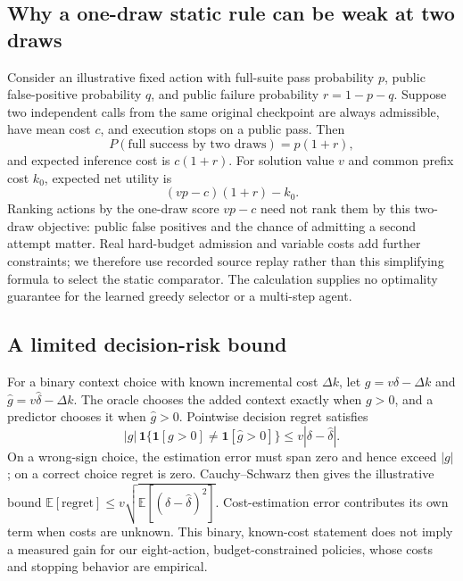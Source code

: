 \documentclass[10pt,twocolumn]{article}
\begin{document}
\subsection{Why a one-draw static rule can be weak at two draws}

Consider an illustrative fixed action with full-suite pass probability $p$,
public false-positive probability $q$, and public failure probability
$r=1-p-q$. Suppose two independent calls from the same original checkpoint are
always admissible, have mean cost $c$, and execution stops on a public pass.
Then
\[
 P(\text{full success by two draws})=p(1+r),
\]
and expected inference cost is $c(1+r)$. For solution value $v$ and common
prefix cost $k_0$, expected net utility is
\[
 (vp-c)(1+r)-k_0.
\]
Ranking actions by the one-draw score $vp-c$ need not rank them by this two-draw
objective: public false positives and the chance of admitting a second attempt
matter. Real hard-budget admission and variable costs add further constraints;
we therefore use recorded source replay rather than this simplifying formula
to select the static comparator. The calculation supplies no optimality
guarantee for the learned greedy selector or a multi-step agent.

\subsection{A limited decision-risk bound}

For a binary context choice with known incremental cost $\Delta k$, let
$g=v\delta-\Delta k$ and $\widehat g=v\widehat\delta-\Delta k$.
The oracle chooses the added context exactly when $g>0$, and a predictor chooses
it when $\widehat g>0$. Pointwise decision regret satisfies
\[
 |g|\,\mathbf1\{\mathbf1[g>0]\ne\mathbf1[\widehat g>0]\}
 \le v|\delta-\widehat\delta|.
\]
On a wrong-sign choice, the estimation error must span zero and hence exceed
$|g|$; on a correct choice regret is zero. Cauchy--Schwarz then gives the
illustrative bound $\mathbb E[\mathrm{regret}]\le
v\sqrt{\mathbb E[(\delta-\widehat\delta)^2]}$.
Cost-estimation error contributes its own term when costs are unknown. This
binary, known-cost statement does not imply a measured gain for our eight-action,
budget-constrained policies, whose costs and stopping behavior are empirical.
\end{document}
